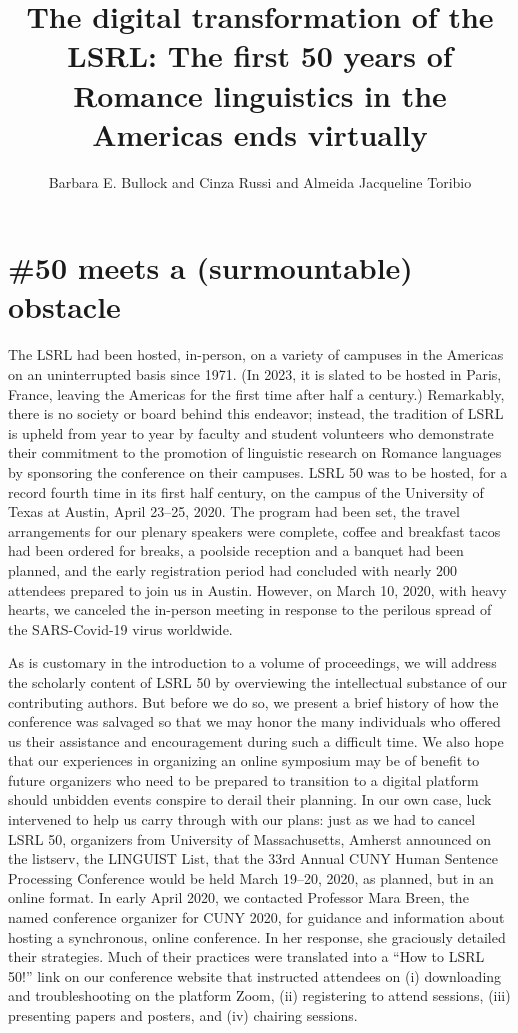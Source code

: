 \documentclass[output=paper,draftmode]{langscibook}
\title[The digital transformation of the LSRL]{The digital transformation of the LSRL: The first 50 years of Romance linguistics in the Americas ends virtually}
\author{Barbara E. Bullock and Cinza Russi and Almeida Jacqueline Toribio    \affiliation{The University of Texas at Austin}}
\begin{document}
\maketitle

\noindent
\section{\#50 meets a (surmountable) obstacle}

The LSRL had been hosted, in-person, on a variety of campuses in the Americas on an uninterrupted basis since 1971. (In 2023, it is slated to be hosted in Paris, France, leaving the Americas for the first time after half a century.) Remarkably, there is no society or board behind this endeavor; instead, the tradition of LSRL is upheld from year to year by faculty and student volunteers who demonstrate their commitment to the promotion of linguistic research on Romance languages by sponsoring the conference on their campuses. LSRL 50 was to be hosted, for a record fourth time in its first half century, on the campus of the University of Texas at Austin, April 23--25, 2020. The program had been set, the travel arrangements for our plenary speakers were complete, coffee and breakfast tacos had been ordered for breaks, a poolside reception and a banquet had been planned, and the early registration period had concluded with nearly 200 attendees prepared to join us in Austin. However, on March 10, 2020, with heavy hearts, we canceled the in-person meeting in response to the perilous spread of the SARS-Covid-19 virus worldwide.

As is customary in the introduction to a volume of proceedings, we will address the scholarly content of LSRL 50 by overviewing the intellectual substance of our contributing authors. But before we do so, we present a brief history of how the conference was salvaged so that we may honor the many individuals who offered us their assistance and encouragement during such a difficult time. We also hope that our experiences in organizing an online symposium may be of benefit to future organizers who need to be prepared to transition to a digital platform should unbidden events conspire to derail their planning.  In our own case, luck intervened to help us carry through with our plans: just as we had to cancel LSRL 50, organizers from University of Massachusetts, Amherst announced on the listserv, the LINGUIST List, that the 33rd Annual CUNY Human Sentence Processing Conference would be held March 19--20, 2020, as planned, but in an online format. In early April 2020, we contacted Professor Mara Breen, the named conference organizer for CUNY 2020, for guidance and information about hosting a synchronous, online conference. In her response, she graciously detailed their strategies. Much of their practices were translated into a “How to LSRL 50!” link on our conference website that instructed attendees on (i) downloading and troubleshooting on the platform Zoom, (ii) registering to attend sessions, (iii) presenting papers and posters, and (iv) chairing sessions.
\end{document}
